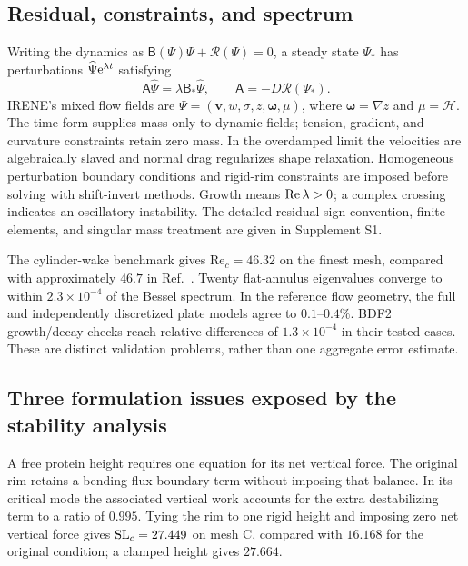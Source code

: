 \subsection{Residual, constraints, and spectrum}
Writing the dynamics as $\mathsf B(\Psi)\dot\Psi+\mathcal R(\Psi)=0$, a steady state $\Psi_*$ has perturbations $\widehat\Psi\mathrm{e}^{\lambda t}$ satisfying
\begin{equation}
\mathsf A\widehat\Psi=\lambda\mathsf B_*\widehat\Psi,\qquad
\mathsf A=-D\mathcal R(\Psi_*).\label{eq:eig}
\end{equation}
IRENE's mixed flow fields are $\Psi=(\bm v,w,\sigma,z,\bm\omega,\mu)$, where $\bm\omega=\nabla z$ and $\mu=\mathcal H$. The time form supplies mass only to dynamic fields; tension, gradient, and curvature constraints retain zero mass. In the overdamped limit the velocities are algebraically slaved and normal drag regularizes shape relaxation. Homogeneous perturbation boundary conditions and rigid-rim constraints are imposed before solving with shift-invert methods. Growth means $\operatorname{Re}\lambda>0$; a complex crossing indicates an oscillatory instability. The detailed residual sign convention, finite elements, and singular mass treatment are given in Supplement S1.

The cylinder-wake benchmark gives $\mathrm{Re}_c=46.32$ on the finest mesh, compared with approximately $46.7$ in Ref.~\cite{wake}. Twenty flat-annulus eigenvalues converge to within $2.3\times10^{-4}$ of the Bessel spectrum. In the reference flow geometry, the full and independently discretized plate models agree to $0.1$--$0.4\%$. BDF2 growth/decay checks reach relative differences of $1.3\times10^{-4}$ in their tested cases. These are distinct validation problems, rather than one aggregate error estimate.


\subsection{Three formulation issues exposed by the stability analysis}
A free protein height requires one equation for its net vertical force. The original  rim retains a bending-flux boundary term without imposing that balance. In its critical mode the associated vertical work accounts for the extra destabilizing term to a ratio of $0.995$. Tying the rim to one rigid height and imposing zero net vertical force gives $\mathrm{SL}_c=27.449$ on mesh C, compared with $16.168$ for the original condition; a clamped height gives $27.664$.


